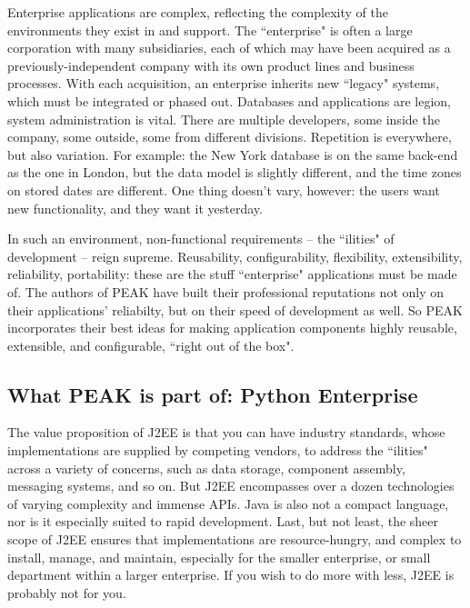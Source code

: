 Enterprise applications are complex, reflecting the complexity of the
environments they exist in and support. The ``enterprise" is often a
large corporation with many subsidiaries, each of which may have been
acquired as a previously-independent company with its own product lines
and business processes. With each acquisition, an enterprise inherits
new ``legacy" systems, which must be integrated or phased out. Databases
and applications are legion, system administration is vital. There are
multiple developers, some inside the company, some outside, some from
different divisions. Repetition is everywhere, but also variation. For
example: the New York database is on the same back-end as the one in
London, but the data model is slightly different, and the time zones on
stored dates are different. One thing doesn't vary, however: the users
want new functionality, and they want it yesterday.

In such an environment, non-functional requirements -- the ``ilities" of
development -- reign supreme. Reusability, configurability, flexibility,
extensibility, reliability, portability: these are the stuff
``enterprise" applications must be made of. The authors of PEAK have
built their professional reputations not only on their applications'
reliabilty, but on their speed of development as well. So PEAK
incorporates their best ideas for making application components highly
reusable, extensible, and configurable, ``right out of the box".

















\subsection{What PEAK is part of: Python Enterprise}

The value proposition of J2EE is that you can have industry standards,
whose implementations are supplied by competing vendors, to address
the ``ilities" across a variety of concerns, such as data storage,
component assembly, messaging systems, and so on.  But J2EE encompasses
over a dozen technologies of varying complexity and immense APIs.  Java
is also not a compact language, nor is it especially suited to rapid
development.  Last, but not least, the sheer scope of J2EE ensures that
implementations are resource-hungry, and complex to install, manage, and
maintain, especially for the smaller enterprise, or small department
within a larger enterprise.  If you wish to do more with less, J2EE is
probably not for you.

